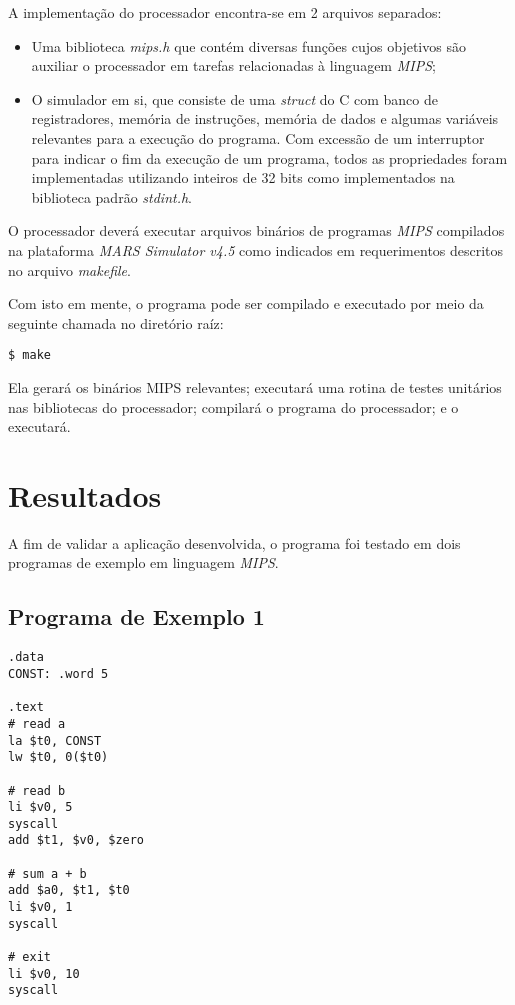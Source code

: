 \documentclass[12pt, a4paper, twoside]{article}
\begin{document}
A implementação do processador encontra-se em 2 arquivos separados:

\begin{itemize}
    \item Uma biblioteca \textit{mips.h} que contém diversas funções cujos
    objetivos são auxiliar o processador em tarefas relacionadas à linguagem
    \textit{MIPS};
    \item O simulador em si, que consiste de uma \textit{struct} do C com
    banco de registradores, memória de instruções, memória de dados e algumas
    variáveis relevantes para a execução do programa. Com excessão de um
    interruptor para indicar o fim da execução de um programa, todos as
    propriedades foram implementadas utilizando inteiros de 32 bits como
    implementados na biblioteca padrão \textit{stdint.h}.
\end{itemize}

O processador deverá executar arquivos binários de programas \textit{MIPS}
compilados na plataforma \textit{MARS Simulator v4.5} como indicados em
requerimentos descritos no arquivo \textit{makefile}.

Com isto em mente, o programa pode ser compilado e executado por meio da
seguinte chamada no diretório raíz:
\begin{lstlisting}[caption=Compilação do simulador MIPS]
$ make
\end{lstlisting}
Ela gerará os binários MIPS relevantes; executará uma rotina de testes
unitários nas bibliotecas do processador; compilará o programa do processador;
e o executará.

\section{Resultados}

A fim de validar a aplicação desenvolvida, o programa foi testado em dois
programas de exemplo em linguagem \textit{MIPS}.

\subsection{Programa de Exemplo 1}

\begin{lstlisting}[caption=Primeiro teste]
.data
CONST: .word 5

.text
# read a
la $t0, CONST
lw $t0, 0($t0)

# read b
li $v0, 5
syscall
add $t1, $v0, $zero

# sum a + b
add $a0, $t1, $t0
li $v0, 1
syscall

# exit
li $v0, 10
syscall
\end{lstlisting}
\end{document}
